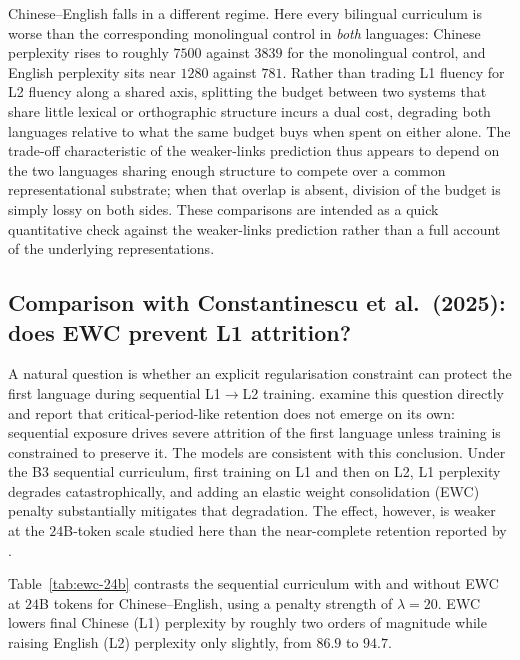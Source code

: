 Chinese--English falls in a different regime. Here every bilingual
curriculum is worse than the corresponding monolingual control in
\emph{both} languages: Chinese perplexity rises to roughly $7500$
against $3839$ for the monolingual control, and English perplexity sits
near $1280$ against $781$. Rather than trading L1 fluency for L2
fluency along a shared axis, splitting the budget between two systems
that share little lexical or orthographic structure incurs a dual cost,
degrading both languages relative to what the same budget buys when
spent on either alone. The trade-off characteristic of the weaker-links
prediction thus appears to depend on the two languages sharing enough
structure to compete over a common representational substrate; when
that overlap is absent, division of the budget is simply lossy on both
sides. These comparisons are intended as a quick quantitative check
against the weaker-links prediction rather than a full account of the
underlying representations.

\subsection{Comparison with Constantinescu et al.\ (2025): does EWC prevent L1 attrition?}

A natural question is whether an explicit regularisation constraint can
protect the first language during sequential L1$\rightarrow$L2 training.
\citet{constantinescu2025investigating} examine this question directly
and report that critical-period-like retention does not emerge on its
own: sequential exposure drives severe attrition of the first language
unless training is constrained to preserve it. The \beetle{} models are
consistent with this conclusion. Under the B3 sequential curriculum,
first training on L1 and then on L2, L1 perplexity degrades
catastrophically, and adding an elastic weight consolidation (EWC)
penalty \citep{kirkpatrick2017overcoming} substantially mitigates that
degradation. The effect, however, is weaker at the $24$B-token scale
studied here than the near-complete retention reported by
\citet{constantinescu2025investigating}.

Table~\ref{tab:ewc-24b} contrasts the sequential curriculum with and
without EWC at $24$B tokens for Chinese--English, using a penalty
strength of $\lambda = 20$. EWC lowers final Chinese (L1) perplexity by
roughly two orders of magnitude while raising English (L2) perplexity
only slightly, from $86.9$ to $94.7$.


